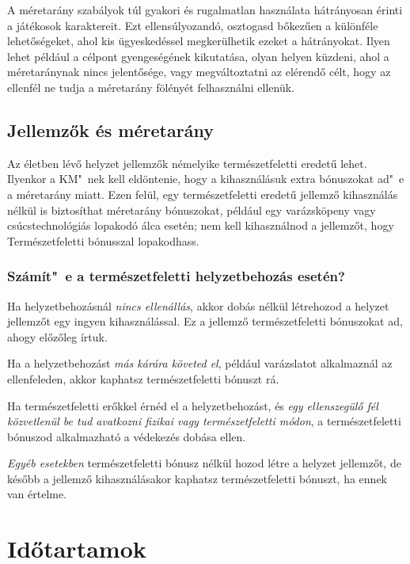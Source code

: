 A méretarány szabályok túl gyakori és rugalmatlan használata hátrányosan érinti a játékosok karaktereit. Ezt ellensúlyozandó, osztogasd bőkezűen a különféle lehetőségeket, ahol kis ügyeskedéssel megkerülhetik ezeket a hátrányokat. Ilyen lehet például a célpont gyengeségének kikutatása, olyan helyen küzdeni, ahol a méretaránynak nincs jelentősége, vagy megváltoztatni az elérendő célt, hogy az ellenfél ne tudja a méretarány fölényét felhasználni ellenük.

\newpage

\subsection{Jellemzők és méretarány}

Az életben lévő helyzet jellemzők némelyike természetfeletti eredetű lehet. Ilyenkor a KM"~nek kell eldöntenie, hogy a kihasználásuk extra bónuszokat ad"~e a méretarány miatt. Ezen felül, egy természetfeletti eredetű jellemző kihasználás nélkül is biztosíthat méretarány bónuszokat, például egy varázsköpeny vagy csúcstechnológiás lopakodó álca esetén; nem kell kihasználnod a  jellemzőt, hogy Természetfeletti bónusszal lopakodhass.

\subsubsection{Számít"~e a természetfeletti helyzetbehozás esetén?}

Ha helyzetbehozásnál \emph{nincs ellenállás}, akkor dobás nélkül létrehozod a helyzet jellemzőt egy ingyen kihasználással. Ez a jellemző természetfeletti bónuszokat ad, ahogy előzőleg írtuk.

Ha a helyzetbehozást \emph{más kárára követed el}, például  varázslatot alkalmaznál az ellenfeleden, akkor kaphatsz természetfeletti bónuszt rá.

Ha természetfeletti erőkkel érnéd el a helyzetbehozást, és \emph{egy ellenszegülő fél közvetlenül be tud avatkozni fizikai vagy természetfeletti módon}, a természetfeletti bónuszod alkalmazható a védekezés dobása ellen.

\emph{Egyéb esetekben} természetfeletti bónusz nélkül hozod létre a helyzet jellemzőt, de később a jellemző kihasználásakor kaphatsz természetfeletti bónuszt, ha ennek van értelme.

\section{Időtartamok}

